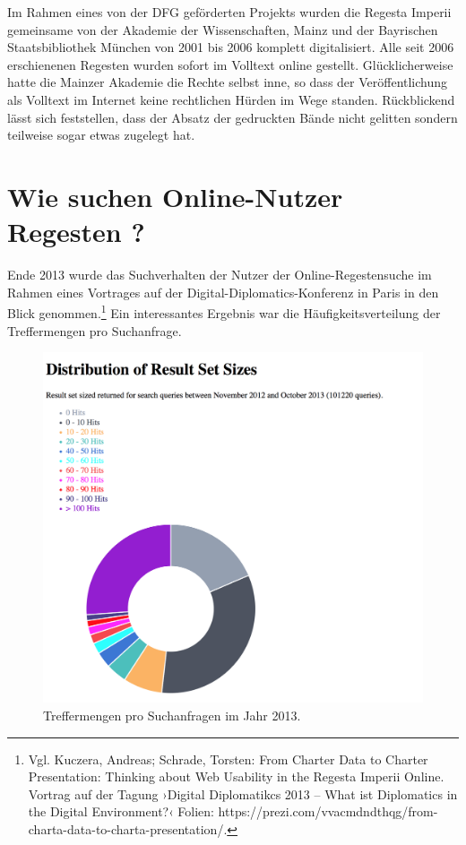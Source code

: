 \documentclass[ngerman,]{scrreprt}
\begin{document}
Im Rahmen eines von der DFG geförderten Projekts wurden die Regesta Imperii gemeinsame von der Akademie der Wissenschaften, Mainz und der Bayrischen Staatsbibliothek München von 2001 bis 2006 komplett digitalisiert. Alle seit 2006 erschienenen Regesten wurden sofort im Volltext online gestellt. Glücklicherweise hatte die Mainzer Akademie die Rechte selbst inne, so dass der Veröffentlichung als Volltext im Internet keine rechtlichen Hürden im Wege standen. Rückblickend lässt sich feststellen, dass der Absatz der gedruckten Bände nicht gelitten sondern teilweise sogar etwas zugelegt hat.

\hypertarget{wie-suchen-online-nutzer-regesten}{%
\section{Wie suchen Online-Nutzer Regesten ?}\label{wie-suchen-online-nutzer-regesten}}

Ende 2013 wurde das Suchverhalten der Nutzer der Online-Regestensuche im Rahmen eines Vortrages auf der Digital-Diplomatics-Konferenz in Paris in den Blick genommen.\footnote{Vgl. Kuczera, Andreas; Schrade, Torsten: From Charter Data to Charter Presentation: Thinking about Web Usability in the Regesta Imperii Online. Vortrag auf der Tagung ›Digital Diplomatikcs 2013 -- What ist Diplomatics in the Digital Environment?‹ Folien: https://prezi.com/vvacmdndthqg/from-charta-data-to-charta-presentation/.} Ein interessantes Ergebnis war die Häufigkeitsverteilung der Treffermengen pro Suchanfrage.

\begin{figure}
\centering
\includegraphics{Bilder/2012-Nutzungsformen_der_RI.png}
\caption{Treffermengen pro Suchanfragen im Jahr 2013.}
\end{figure}
\end{document}
